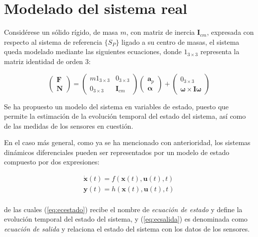 \section{Modelado del sistema real}

Considérese un sólido rígido, de masa $m$, con matriz de inercia $\boldsymbol{I}_{cm}$, expresada con respecto al sistema de referencia $\{S_P\}$ ligado a su centro de masas, el sistema queda modelado mediante las siguientes ecuaciones, donde $1_{3\times3}$ representa la matriz identidad de orden 3:

\begin{equation}
	\begin{pmatrix}
		\boldsymbol{F} \\ \boldsymbol{N}
	\end{pmatrix}
	=
	\begin{pmatrix}
		m1_{3\times3} & 0_{3\times3} \\ 0_{3\times3} & \boldsymbol{I}_{cm}
	\end{pmatrix}
	\begin{pmatrix}
		\boldsymbol{a}_p \\ \boldsymbol{\alpha}
	\end{pmatrix} +
	\begin{pmatrix}
		0_{3\times3} \\ \boldsymbol{\omega} \times \boldsymbol{I}\boldsymbol{\omega}
	\end{pmatrix}
\label{eq:newtoneuler}	
\end{equation}

Se ha propuesto un modelo del sistema en variables de estado, puesto que permite la estimación de la evolución temporal del estado del sistema, así como de las medidas de los sensores en cuestión. \par 

En el caso más general, como ya se ha mencionado con anterioridad, los sistemas dinámicos diferenciales pueden ser representados por un modelo de estado compuesto por dos expresiones:

\begin{subequations}
\begin{align}
	\boldsymbol{\dot{x}}(t) = f(\boldsymbol{x}(t),\boldsymbol{u}(t),t)
	\label{eq:ecestado} \\
	\boldsymbol{y}(t) = h(\boldsymbol{x}(t),\boldsymbol{u}(t),t)
	\label{eq:ecsalida}
\end{align}
\end{subequations} \\
\noindent
de las cuales (\ref{eq:ecestado}) recibe el nombre de \emph{ecuación de estado} y define la evolución temporal del estado del sistema, y (\ref{eq:ecsalida}) es denominada como \emph{ecuación de salida} y relaciona el estado del sistema con los datos de los sensores. \par

